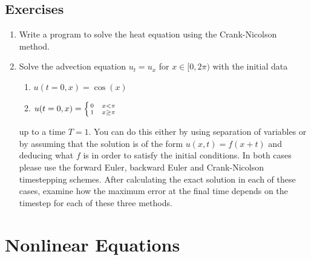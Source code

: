 \subsection{Exercises}
\begin{enumerate}
\item[1)] Write a program to solve the heat equation using the Crank-Nicolson method.
\item[2)] Solve the advection equation $u_t=u_x$ for $x\in[0,2\pi)$ with the initial data
\begin{enumerate}
\item[a)] $u(t=0,x)=\cos(x)$
\item[b)] $u(t=0,x)=\left\{{0\quad x<\pi}\atop{1\quad x\geq\pi}\right.$
\end{enumerate}
up to a time $T=1$. You can do this either by using separation of variables or by assuming that the solution is of the form $u(x,t)=f(x+t)$ and deducing what $f$ is in order to satisfy the initial conditions. In both cases please use the forward Euler, backward Euler and Crank-Nicolson timestepping schemes. After calculating the exact solution in each of these cases, examine how the maximum error at the final time depends on the timestep for each of these three methods.
\end{enumerate}


\section{Nonlinear Equations}
